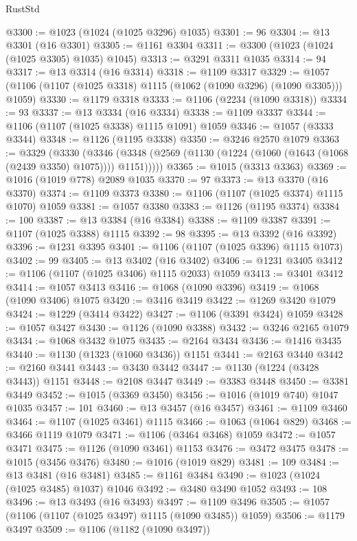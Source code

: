 \begin{lexlean}{RustStd}
\begin{coremodule}
@3300 := @1023 (@1024 (@1025 @3296) @1035)
@3301 := 96
@3304 := @13 @3301 (@16 @3301)
@3305 := @1161 @3304
@3311 := @3300 (@1023 (@1024 (@1025 @3305) @1035) @1045)
@3313 := @3291 @3311 @1035
@3314 := 94
@3317 := @13 @3314 (@16 @3314)
@3318 := @1109 @3317
@3329 := @1057 (@1106 (@1107 (@1025 @3318) @1115 (@1062 (@1090 @3296) (@1090 @3305))) @1059)
@3330 := @1179 @3318
@3333 := @1106 (@2234 (@1090 @3318))
@3334 := 93
@3337 := @13 @3334 (@16 @3334)
@3338 := @1109 @3337
@3344 := @1106 (@1107 (@1025 @3338) @1115 @1091) @1059
@3346 := @1057 (@3333 @3344)
@3348 := @1126 (@1195 @3338)
@3350 := @3246 @2570 @1079
@3363 := @3329
    (@3330
      (@3346 (@3348 (@2569 (@1130 (@1224 (@1060 (@1643 (@1068 (@2439 @3350) @1075)))) @1151)))))
@3365 := @1015 (@3313 @3363)
@3369 := @1016 (@1019 @778) @2089 @1035
@3370 := 97
@3373 := @13 @3370 (@16 @3370)
@3374 := @1109 @3373
@3380 := @1106 (@1107 (@1025 @3374) @1115 @1070) @1059
@3381 := @1057 @3380
@3383 := @1126 (@1195 @3374)
@3384 := 100
@3387 := @13 @3384 (@16 @3384)
@3388 := @1109 @3387
@3391 := @1107 (@1025 @3388) @1115
@3392 := 98
@3395 := @13 @3392 (@16 @3392)
@3396 := @1231 @3395
@3401 := @1106 (@1107 (@1025 @3396) @1115 @1073)
@3402 := 99
@3405 := @13 @3402 (@16 @3402)
@3406 := @1231 @3405
@3412 := @1106 (@1107 (@1025 @3406) @1115 @2033) @1059
@3413 := @3401 @3412
@3414 := @1057 @3413
@3416 := @1068 (@1090 @3396)
@3419 := @1068 (@1090 @3406) @1075
@3420 := @3416 @3419
@3422 := @1269 @3420 @1079
@3424 := @1229 (@3414 @3422)
@3427 := @1106 (@3391 @3424) @1059
@3428 := @1057 @3427
@3430 := @1126 (@1090 @3388)
@3432 := @3246 @2165 @1079
@3434 := @1068 @3432 @1075
@3435 := @2164 @3434
@3436 := @1416 @3435
@3440 := @1130 (@1323 (@1060 @3436)) @1151
@3441 := @2163 @3440
@3442 := @2160 @3441
@3443 := @3430 @3442
@3447 := @1130 (@1224 (@3428 @3443)) @1151
@3448 := @2108 @3447
@3449 := @3383 @3448
@3450 := @3381 @3449
@3452 := @1015 (@3369 @3450)
@3456 := @1016 (@1019 @740) @1047 @1035
@3457 := 101
@3460 := @13 @3457 (@16 @3457)
@3461 := @1109 @3460
@3464 := @1107 (@1025 @3461) @1115
@3466 := @1063 (@1064 @829)
@3468 := @3466 @1119 @1079
@3471 := @1106 (@3464 @3468) @1059
@3472 := @1057 @3471
@3475 := @1126 (@1090 @3461) @1153
@3476 := @3472 @3475
@3478 := @1015 (@3456 @3476)
@3480 := @1016 (@1019 @829)
@3481 := 109
@3484 := @13 @3481 (@16 @3481)
@3485 := @1161 @3484
@3490 := @1023 (@1024 (@1025 @3485) @1037) @1046
@3492 := @3480 @3490 @1052
@3493 := 108
@3496 := @13 @3493 (@16 @3493)
@3497 := @1109 @3496
@3505 := @1057 (@1106 (@1107 (@1025 @3497) @1115 (@1090 @3485)) @1059)
@3506 := @1179 @3497
@3509 := @1106 (@1182 (@1090 @3497))

\end{coremodule}
\end{lexlean}
